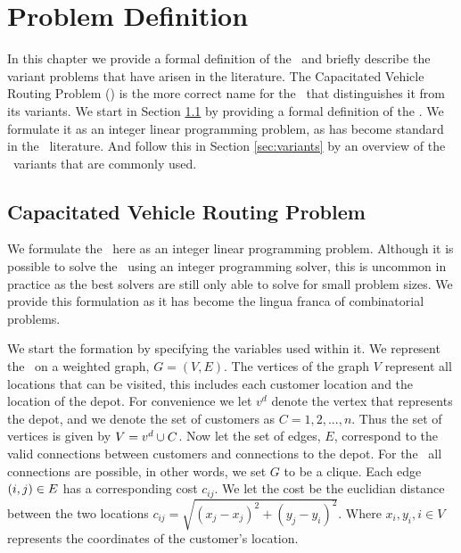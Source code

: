 
\chapter{Problem Definition}
\label{chap:pd}

In this chapter we provide a formal definition of the \VRP\ and briefly describe the variant problems that have arisen in the literature. The Capacitated Vehicle Routing Problem (\CVRP) is the more correct name for the \VRP\ that distinguishes it from its variants. We start in Section \ref{sec:capacitatedvehicleroutingproblem} by providing a formal definition of the \CVRP. We formulate it as an integer linear programming problem, as has become standard in the \VRP\ literature. And follow this in Section \ref{sec:variants} by an overview of the \VRP\ variants that are commonly used.

\section{Capacitated Vehicle Routing Problem}
\label{sec:capacitatedvehicleroutingproblem}

We formulate the \CVRP\ here as an integer linear programming problem. Although it is possible to solve the \CVRP\ using an integer programming solver, this is uncommon in practice as the best solvers are still only able to solve for small problem sizes. We provide this formulation as it has become the lingua franca of combinatorial problems.

We start the formation by specifying the variables used within it. We represent the \CVRP\ on a weighted graph, $G = (V, E)$. The vertices of the graph $V$ represent all locations that can be visited, this includes each customer location and the location of the depot. For convenience we let $v^d$ denote the vertex that represents the depot, and we denote the set of customers as $C = 1,2,...,n$. Thus the set of vertices is given by $V = v^d \cup C$. Now let the set of edges, $E$, correspond to the valid connections between customers and connections to the depot. For the \CVRP\ all connections are possible, in other words, we set $G$ to be a clique. Each edge $(i,j) \in E$ has a corresponding cost $c_{ij}$. We let the cost be the euclidian distance between the two locations $c_{ij} = \sqrt{(x_j - x_j)^2 + (y_j -  y_i)^2}$. Where $x_i, y_i, i \in V$ represents the coordinates of the customer's location. 


